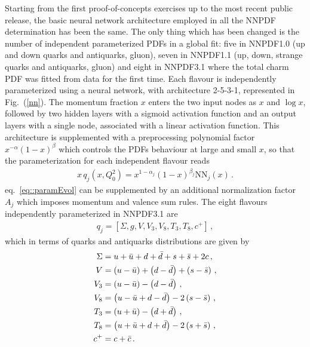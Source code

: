 %
Starting from the first proof-of-concepts exercises up to the most recent public release, the basic
neural network architecture employed in all the NNPDF determination has been the same.
The only thing which has been changed is the number of independent parameterized PDFs in a global fit:
five in NNPDF1.0 (up and down quarks and antiquarks, gluon), 
seven in NNPDF1.1 (up, down, strange quarks and antiquarks, gluon) and eight in NNPDF3.1
where the total charm PDF was fitted from data for the first time.
Each flavour is independently parameterized using a neural network,
with architecture 2-5-3-1, represented in Fig.~(\ref{nn}). 
The momentum fraction $x$ enters the two input nodes as $x$ and $\log{x}$, followed by two hidden layers with a sigmoid activation function and an output layers with a single node, 
associated with a linear activation function. 
This architecture is supplemented with a preprocessing polynomial factor $x^{-\alpha}\left(1-x\right)^{\beta}$ which controls the PDFs behaviour
at large and small $x$, so that the parameterization for each independent flavour reads
\begin{align}
	\label{eq::paramEvol}
	x\,q_j\left(x, Q_0^2\right) = x^{1-\alpha_{j}}\left(1-x\right)^{\beta_{j}}\text{NN}_{j}\left(x\right)\,.
\end{align}
eq.~\eqref{eq::paramEvol} can be supplemented by an additional normalization factor $A_j$ which imposes momentum
and valence sum rules. The eight flavours independently parameterized in NNPDF3.1 are 
\begin{align}
    \label{eq:nnpdf31IC_basis}
    q_j = \left[\Sigma, g, V, V_3, V_8, T_3, T_8, c^+ \right]\,,
\end{align} 
which in terms of quarks and antiquarks distributions are given by
\begin{align}
    \Sigma  &=  u+\bar{u} + d+\bar{d} + s+\bar{s} + 2c  \, ,  \nonumber \\
    V     &= \left( u-\bar{u}\right) + \left( d-\bar{d}\right) + \left( s-\bar{s}\right)   \, ,\nonumber \\
    V_3     &=  \left( u-\bar{u}\right) - \left(  d-\bar{d}  \right) \, , \nonumber\\
    V_8     &=  \left( u-\bar{u} +  d-\bar{d}  \right) - 2\left( s-\bar{s} \right) \,,\\
    T_3     &=  \left( u+\bar{u}\right) - \left(  d+\bar{d}  \right) \, ,  \nonumber\\
    T_8     &=  \left( u+\bar{u} +  d+\bar{d}  \right) - 2\left( s+\bar{s} \right) \, , \nonumber\\
    c^+ &= c +\bar{c}\,. \nonumber
  \end{align}

